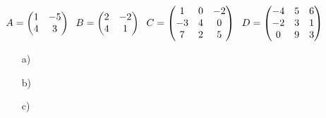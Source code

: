 \subsection{}
\begin{math}
    A=\begin{pmatrix}
        1 & -5\\
        4 & 3
    \end{pmatrix}
    \hspace{6px}
    B=\begin{pmatrix}
        2 & -2\\
        4 & 1
    \end{pmatrix}
    \hspace{6px}
    C=\begin{pmatrix}
        1 & 0 & -2\\
        -3 & 4 & 0\\
        7 & 2 & 5
    \end{pmatrix}
    \hspace{6px}
    D=\begin{pmatrix}
        -4 & 5 & 6\\
        -2 & 3 & 1\\
        0 & 9 & 3
    \end{pmatrix}
\end{math}
\begin{enumerate}
    \item[a)]
        \begin{math}
            
        \end{math}
    \item[b)]
        \begin{math}
        \end{math}
    \item[c)]
        \begin{math}
        \end{math}
\end{enumerate}